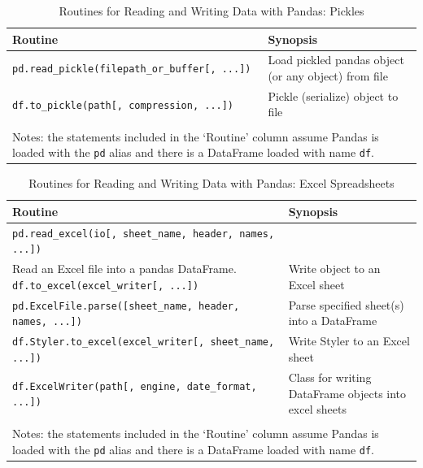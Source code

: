 \documentclass[a4paper,11pt]{book}
\begin{document}
\begin{table}
	\centering
	\caption{Routines for Reading and Writing Data with Pandas: Pickles}
	\label{tab:io_pickles}
	\begin{tabular}{lp{10cm}}
		\toprule \toprule
			Routine & Synopsis \\
			\midrule
			\texttt{pd.read\_pickle(filepath\_or\_buffer[, ...])} & Load pickled pandas object (or any object) from file\\
			\texttt{df.to\_pickle(path[, compression, ...])} & Pickle (serialize) object to file\\ 
			\bottomrule \\[-1.8ex]
		    \multicolumn{2}{l}{Notes: the statements included in the `Routine' column assume Pandas is loaded with the \texttt{pd} alias and there is a DataFrame loaded with name \texttt{df}.} \\
	\end{tabular}
\end{table}

\begin{table}
	\centering
	\caption{Routines for Reading and Writing Data with Pandas: Excel Spreadsheets}
	\label{tab:io_excel}
	\begin{tabular}{lp{10cm}}
		\toprule \toprule
			Routine & Synopsis \\
			\midrule
			\texttt{pd.read\_excel(io[, sheet\_name, header, names, ...])} & \\ 
                        Read an Excel file into a pandas DataFrame.
                        \texttt{df.to\_excel(excel\_writer[, ...])} & 
                        Write object to an Excel sheet\\
                        \texttt{pd.ExcelFile.parse([sheet\_name, header, names, ...])} & 
                        Parse specified sheet(s) into a DataFrame\\
                        \texttt{df.Styler.to\_excel(excel\_writer[, sheet\_name, ...])} & 
                        Write Styler to an Excel sheet\\
                        \texttt{df.ExcelWriter(path[, engine, date\_format, ...])} & 
                        Class for writing DataFrame objects into excel sheets\\
			\bottomrule \\[-1.8ex]
		    \multicolumn{2}{l}{Notes: the statements included in the `Routine' column assume Pandas is loaded with the \texttt{pd} alias and there is a DataFrame loaded with name \texttt{df}.} \\
	\end{tabular}
\end{table}
\end{document}
